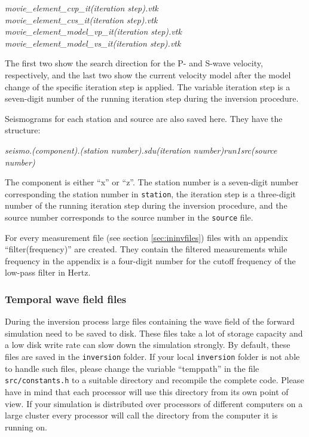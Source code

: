 			\begin{center}%
				\emph{movie\_element\_cvp\_it(iteration step).vtk}\\
				\emph{movie\_element\_cvs\_it(iteration step).vtk}\\
				\emph{movie\_element\_model\_vp\_it(iteration step).vtk}\\
				\emph{movie\_element\_model\_vs\_it(iteration step).vtk}
			\end{center}
			
			The first two show the search direction for the P- and S-wave velocity, respectively, and the last two show the current velocity model after the model change of the specific iteration step is applied. The variable iteration step is a seven-digit number of the running iteration step during the inversion procedure. 
			
			Seismograms for each station and source are also saved here. They have the structure:
			
			\begin{center}%
				\emph{seismo.(component).(station number).sdu(iteration number)run1src(source number)}
			\end{center}
			
			The component is either ``x'' or ``z''. The station number is a seven-digit number corresponding the station number in \texttt{station}, the iteration step is a three-digit number of the running iteration step during the inversion procedure, and the source number corresponds to the source number in the \texttt{source} file. 
			
			For every measurement file (see section \ref{sec:ininvfiles}) files with an appendix ``filter(frequency)'' are created. They contain the filtered measurements while frequency in the appendix is a four-digit number for the cutoff frequency of the low-pass filter in Hertz.
			
		\subsubsection{Temporal wave field files}
		
		During the inversion process large files containing the wave field of the forward simulation need to be saved to disk. These files take a lot of storage capacity and a low disk write rate can slow down the simulation strongly. By default, these files are saved in the \texttt{inversion} folder. If your local \texttt{inversion} folder is not able to handle such files, please change the variable ``temppath'' in the file \texttt{src/constants.h} to a suitable directory and recompile the complete code. Please have in mind that each processor will use this directory from its own point of view. If your simulation is distributed over processors of different computers on a large cluster every processor will call the directory from the computer it is running on.
			
